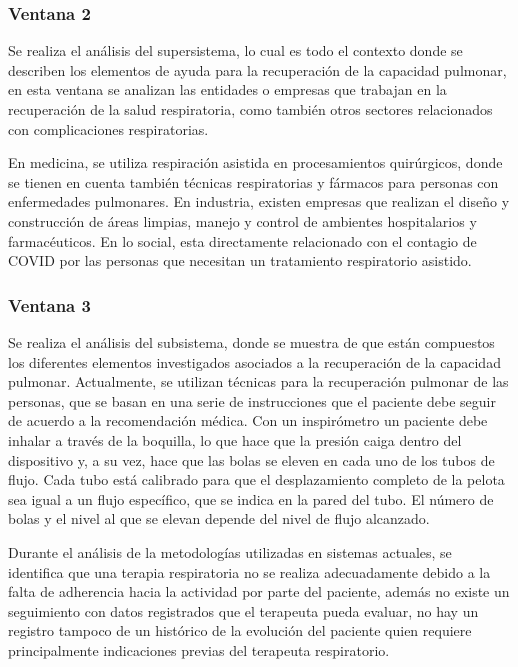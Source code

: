 \documentclass[12pt]{article}
\begin{document}
\subsubsection{Ventana 2}

Se realiza el  análisis del supersistema, lo cual es todo el contexto donde se describen los elementos de ayuda para la recuperación de la capacidad pulmonar, en esta ventana se analizan las entidades o empresas que trabajan en la recuperación de la salud respiratoria, como también otros sectores relacionados con complicaciones respiratorias. 

En medicina, se utiliza respiración asistida en procesamientos quirúrgicos, donde se tienen en cuenta también técnicas respiratorias y fármacos para personas con enfermedades pulmonares. En industria, existen empresas que realizan el diseño y construcción de áreas limpias, manejo y control de ambientes hospitalarios y farmacéuticos. En lo social, esta directamente relacionado con el contagio de COVID por las personas que necesitan un tratamiento respiratorio asistido.

\subsubsection{Ventana 3}

Se realiza el  análisis del subsistema, donde se muestra de que están compuestos los diferentes elementos  investigados asociados a la recuperación de la capacidad pulmonar. Actualmente, se utilizan técnicas para la recuperación pulmonar de las personas, que se basan en una serie de instrucciones que el paciente debe seguir de acuerdo a la recomendación médica. Con un inspirómetro un paciente debe inhalar a través de la boquilla, lo que hace que la presión caiga dentro del dispositivo y, a su vez, hace que las bolas se eleven en cada uno de los tubos de flujo. Cada tubo está calibrado para que el desplazamiento completo de la pelota sea igual a un flujo específico, que se indica en la pared del tubo. El número de bolas y el nivel al que se elevan depende del nivel de flujo alcanzado. 




Durante el análisis de la metodologías utilizadas en sistemas actuales, se identifica que una terapia respiratoria no se realiza adecuadamente debido a la falta de adherencia hacia la actividad por parte del paciente, además no existe un seguimiento con datos registrados que el terapeuta pueda evaluar, no hay un registro tampoco de un histórico de la evolución del paciente quien requiere principalmente indicaciones previas del terapeuta respiratorio.
\end{document}
